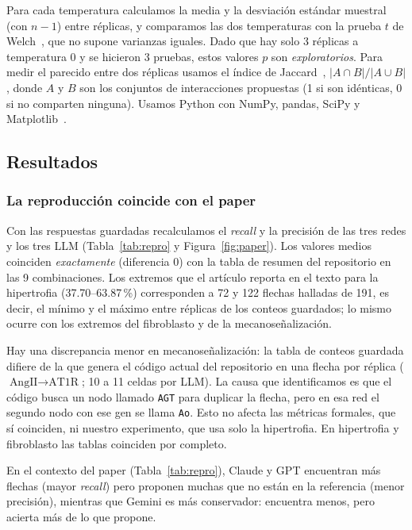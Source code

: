 \documentclass[unnumsec,webpdf,contemporary,large]{oup-authoring-template}
\begin{document}
Para cada temperatura calculamos la media y la desviación estándar muestral (con $n-1$) entre réplicas, y comparamos las dos temperaturas con la prueba $t$ de Welch~\cite{welch1947}, que no supone varianzas iguales. Dado que hay solo 3 réplicas a temperatura 0 y se hicieron 3 pruebas, estos valores $p$ son \emph{exploratorios}. Para medir el parecido entre dos réplicas usamos el índice de Jaccard~\cite{jaccard1912}, $|A\cap B|/|A\cup B|$, donde $A$ y $B$ son los conjuntos de interacciones propuestas (1 si son idénticas, 0 si no comparten ninguna). Usamos Python con NumPy, pandas, SciPy y Matplotlib~\cite{numpy2020,pandas2010,scipy2020,hunter2007}.

\subsection{Resultados}\label{sec:A:resultados}

\subsubsection{La reproducción coincide con el paper}

Con las respuestas guardadas recalculamos el \emph{recall} y la precisión de las tres redes y los tres LLM (Tabla~\ref{tab:repro} y Figura~\ref{fig:paper}). Los valores medios coinciden \emph{exactamente} (diferencia 0) con la tabla de resumen del repositorio en las 9 combinaciones. Los extremos que el artículo reporta en el texto para la hipertrofia (37.70--63.87\,\%) corresponden a 72 y 122 flechas halladas de 191, es decir, el mínimo y el máximo entre réplicas de los conteos guardados; lo mismo ocurre con los extremos del fibroblasto y de la mecanoseñalización.

Hay una discrepancia menor en mecanoseñalización: la tabla de conteos guardada difiere de la que genera el código actual del repositorio en una flecha por réplica ($\text{AngII}\to\text{AT1R}$; 10 a 11 celdas por LLM). La causa que identificamos es que el código busca un nodo llamado \texttt{AGT} para duplicar la flecha, pero en esa red el segundo nodo con ese gen se llama \texttt{Ao}. Esto no afecta las métricas formales, que sí coinciden, ni nuestro experimento, que usa solo la hipertrofia. En hipertrofia y fibroblasto las tablas coinciden por completo.

En el contexto del paper (Tabla~\ref{tab:repro}), Claude y GPT encuentran más flechas (mayor \emph{recall}) pero proponen muchas que no están en la referencia (menor precisión), mientras que Gemini es más conservador: encuentra menos, pero acierta más de lo que propone.
\end{document}

